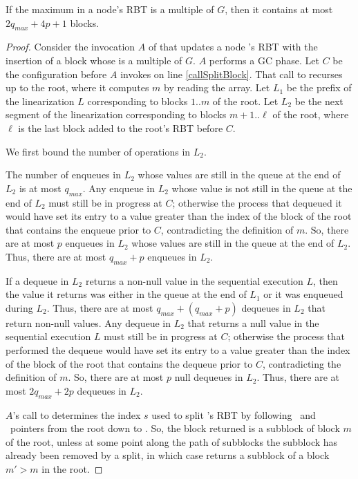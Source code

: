\begin{lemma}\label{boundAfterGC}
If the maximum  in a node's RBT is a multiple of $G$, then
it contains at most $2q_{max}+4p+1$ blocks.
\end{lemma}
\begin{proof}
Consider the invocation $A$ of  that updates a node 's RBT with the insertion of a block whose 
 is a multiple of $G$.
$A$ performs a GC phase.
Let $C$ be the configuration before $A$ invokes  on line \ref{callSplitBlock}.
That call to  recurses up to the root, where it computes $m$ by reading the 
array.
Let $L_1$ be the prefix of the linearization $L$ corresponding to blocks $1..m$ of the root.
Let $L_2$ be the next segment of the linearization corresponding to blocks $m+1..\ell$ of the root, where
$\ell$ is the last block added to the root's RBT before $C$.

We first bound the number of operations in $L_2$.

The number of enqueues in $L_2$ whose values are still in the queue at the end of $L_2$ is at most $q_{max}$.
Any enqueue in $L_2$ whose value is not still in the queue at the end of $L_2$
must still be in progress at $C$; otherwise the process that dequeued it would have
set its  entry to a value greater than the index of the block of the root that contains the enqueue prior to $C$,
contradicting the definition of $m$.
So, there are at most $p$ enqueues in $L_2$ whose values are still in the queue at the end of $L_2$.
Thus, there are at most $q_{max}+p$ enqueues in $L_2$.

If a dequeue in $L_2$ returns a non-null value in the sequential execution $L$,
then the value it returns was either in the queue at the end of $L_1$ or it was enqueued during $L_2$.
Thus, there are at most $q_{max}+(q_{max}+p)$ dequeues in $L_2$ that return non-null values.
Any dequeue in $L_2$ that returns a null value in the sequential execution $L$ must still be in progress
at $C$; otherwise the process that performed the dequeue would have set its  entry
to a value greater than the index of the block of the root that contains the dequeue prior to $C$, 
contradicting the definition of $m$.
So, there are at most $p$ null dequeues in $L_2$.
Thus, there are at most $2q_{max} + 2p$ dequeues in $L_2$.

$A$'s call to  determines the index $s$ used to split 's RBT by following 
\eleft\ and \eright\ pointers from the root down to .
So, the block returned is a subblock of block $m$ of the root, unless
at some point along the path of subblocks the subblock has already been removed by a split,
in which case  returns a subblock of a block $m'>m$ in the root.


\end{proof}
